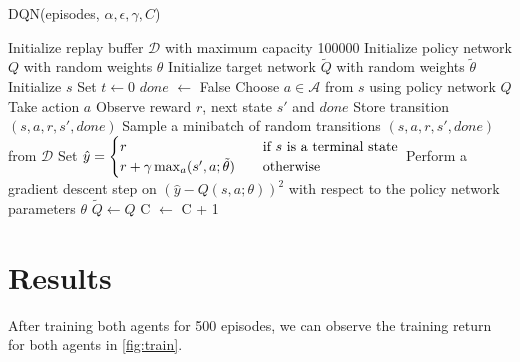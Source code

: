 \documentclass{article}
\begin{document}
\begin{algorithm}[H]
      \caption{DQN(episodes, \(\alpha, \epsilon, \gamma, C\))}
      \label{alg:dqn}
      \begin{algorithmic}[1]
            \State Initialize replay buffer \(\mathcal{D}\) with maximum capacity 100000
            \State Initialize policy network \(Q\) with random weights \(\theta\)
            \State Initialize target network \(\tilde{Q}\) with random weights \(\tilde{\theta}\) 
            \State Initialize \(s\)
            \State Set \(t \leftarrow 0\) 
            \State \(done\) \(\leftarrow\) False
            \State Choose \(a \in \mathcal{A}\) from \(s\) using policy network \(Q\) 
            \State Take action \(a\)
            \State Observe reward \(r\), next state \(s'\) and \(done\)
            \State Store transition \((s, a, r, s', done)\)
            \State Sample a minibatch of random transitions \((s, a, r, s', done)\) from \(\mathcal{D}\)
            \State Set \(\hat{y} =
            \begin{cases}
                  r                                                  & \quad \text{if }s \text{ is a terminal state} \\
                  r + \gamma \max_a \title{Q}(s', a; \tilde{\theta}) & \quad \text{otherwise}
            \end{cases}\)
            \State Perform a gradient descent step on \(\left(\hat{y} - Q(s, a; \theta)\right)^2\) with respect to the policy network parameters \(\theta\)
            \State \(\tilde{Q} \leftarrow Q\) 
            \EndIf
            \State C \(\leftarrow\) C + 1
            \EndWhile
            \EndFor
      \end{algorithmic}
\end{algorithm}

\section{Results}

After training both agents for 500 episodes, we can observe the training return
for both agents in \cref{fig:train}.
\end{document}
